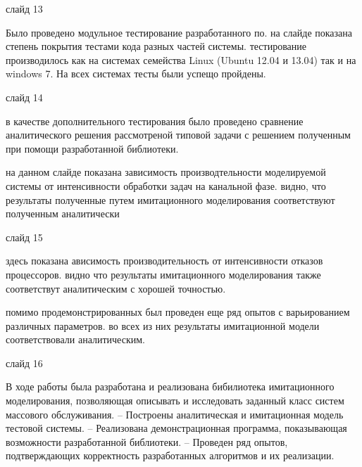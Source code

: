 \documentclass[utf8x, 12pt]{G7-32} %
\begin{document}
слайд 13

Было проведено модульное тестирование разработанного по. на слайде показана степень покрытия тестами кода разных частей системы. тестирование производилось как на системах семейства Linux (Ubuntu 12.04 и 13.04) так и на windows 7. На всех системах тесты были успещо пройдены.

слайд 14

 в качестве дополнительного тестирования было проведено сравнение аналитического решения рассмотреной типовой задачи с решением полученным при помощи разработанной библиотеки.
 
 на данном слайде показана зависимость производтельности моделируемой системы от интенсивности обработки задач на канальной фазе.  видно, что результаты полученные путем имитационного моделирования соответствуют полученным аналитически
 
 слайд 15

 
 
 здесь показана ависимость производительность от интенсивности отказов процессоров. видно что результаты имитационного моделирования также соответствут аналитическим с хорошей точностью.
 
 помимо продемонстрированных был проведен еще ряд опытов с варьированием различных параметров. во всех из них результаты имитационной модели соответствовали аналитическим.
 
 слайд 16
 
  В ходе работы была разработана и реализована бибилиотека
имитационного моделирования, позволяющая описывать и исследовать
заданный класс систем массового обслуживания.
– Построены аналитическая и имитационная модель тестовой системы.
– Реализована демонстрационная программа, показывающая возможности
разработанной библиотеки.
– Проведен ряд опытов, подтверждающих корректность разработанных
алгоритмов и их реализации.
 
\end{document}
